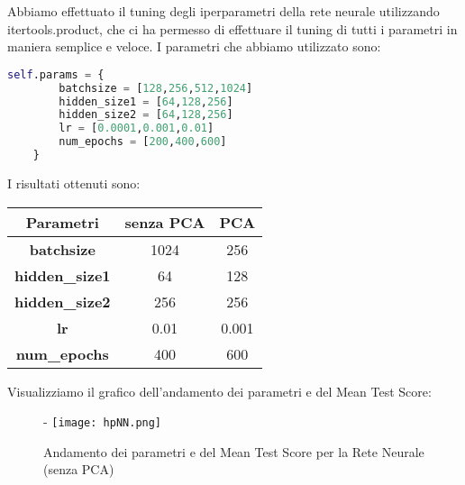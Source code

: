 \documentclass[../../Report.tex]{subfiles}
\begin{document}
Abbiamo effettuato il tuning degli iperparametri della rete neurale utilizzando itertools.product, che ci ha permesso di effettuare il tuning di tutti i parametri in maniera semplice e veloce.
I parametri che abbiamo utilizzato sono:
\begin{lstlisting}[language=python]
    self.params = {
        batchsize = [128,256,512,1024]	
        hidden_size1 = [64,128,256]
        hidden_size2 = [64,128,256]
        lr = [0.0001,0.001,0.01]
        num_epochs = [200,400,600]
    }
\end{lstlisting}
I risultati ottenuti sono:
\begin{table}[H]
    \centering
    \begin{tabular}{|c|c|c|}
    \hline
    \textbf{Parametri} & \textbf{senza PCA} & \textbf{PCA} \\ \hline
    \textbf{batchsize}& 1024 & 256\\
    \textbf{hidden\_size1}& 64 &  128 \\
    \textbf{hidden\_size2}& 256 & 256\\
    \textbf{lr}& 0.01 &  0.001\\
    \textbf{num\_epochs}& 400 & 600\\
    \hline
\end{tabular}
\end{table}

Visualizziamo il grafico dell'andamento dei parametri e del Mean Test Score:
\begin{figure}[H]-
    \centering
    \texttt{[image: hpNN.png]}
    \caption{Andamento dei parametri e del Mean Test Score per la Rete Neurale (senza PCA)}
\end{figure}
\end{document}

